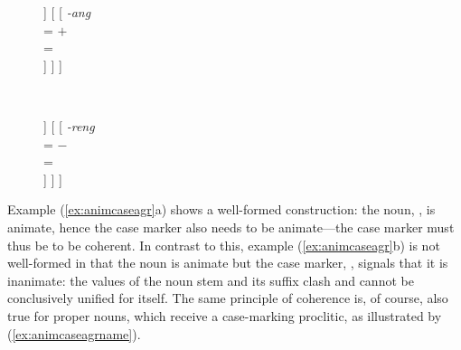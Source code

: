 \begin{figure}
\ex\label{ex:animcaseagr}
\begin{minipage}[t]{.5\remaining}
\tl\quad\label{ex:animok} %
\begin{forest}
[\anno{\xhead{N}}
	[\anno{N\tsub{stem}}
		[{%
			\textit{gan} \\
			\ups{\Anim} = $+$ \\
		}]
	]
	[
		[{%
			\textit{-ang} \\
			\ups{\Anim} = $+$ \\
			\ups{\Case} = \Aarg{} \\
		}]
	]
]
\end{forest}
\end{minipage}
~
\begin{minipage}[t]{.5\remaining}
\tl\quad\label{ex:animclash} %
\ljudge*\begin{forest}
[\anno{\xhead{N}}
	[\anno{N\tsub{stem}}
		[{%
			\textit{gan} \\
			\ups{\Anim} = $+$ \\
		}]
	]
	[
		[{%
			\textit{-reng} \\
			\ups{\Anim} = $-$ \\
			\ups{\Case} = \Aarg{} \\
		}]
	]
]
\end{forest}
\end{minipage}
\xe
\end{figure}

Example (\ref{ex:animcaseagr}a) shows a well-formed construction: the noun,
, is animate, hence the case marker also needs to be 
animate---the case marker must thus be  to be coherent. In
contrast to this, example (\ref{ex:animcaseagr}b) is not well-formed in that
the noun is animate but the case marker, , signals that it
is inanimate: the \Anim{} values of the noun stem and its suffix clash and
cannot be conclusively unified for  itself. The same principle of
coherence is, of course, also true for proper nouns, which receive a
case-marking proclitic, as illustrated by (\ref{ex:animcaseagrname}).


